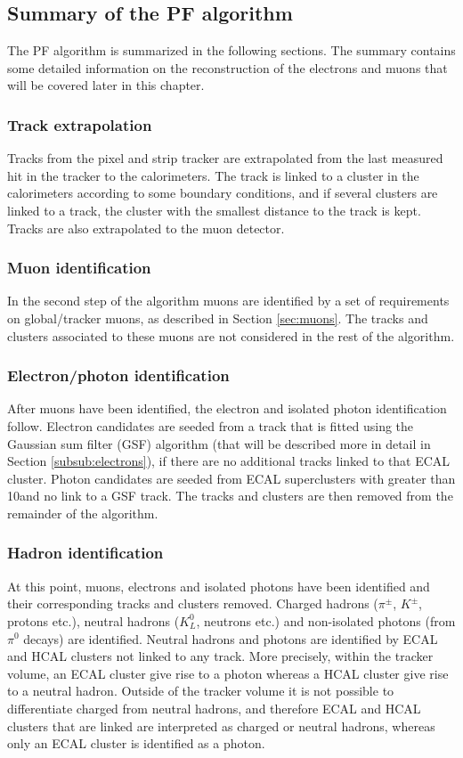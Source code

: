 \subsection*{Summary of the PF algorithm}
\noindent\justify
The PF algorithm is summarized in the following sections. 
The summary contains some detailed information on the reconstruction of the electrons and muons that will be covered later in this chapter.  
\subsubsection*{Track extrapolation}
\noindent\justify
Tracks from the pixel and strip tracker are extrapolated from the last measured hit in the tracker to the calorimeters. 
The track is linked to a cluster in the calorimeters according to some boundary conditions, and if several clusters are linked to a track, the cluster with the smallest distance to the track is kept. 
Tracks are also extrapolated to the muon detector. 
\subsubsection*{Muon identification} 
\noindent\justify
In the second step of the algorithm muons are identified by a set of requirements on global/tracker muons, as described in Section \ref{sec:muons}.
The tracks and clusters associated to these muons are not considered in the rest of the algorithm. 
\subsubsection*{Electron/photon identification} 
\noindent\justify
After muons have been identified, the electron and isolated photon identification follow.
Electron candidates are seeded from a track that is fitted using the Gaussian sum filter (GSF) algorithm (that will be described more in detail in Section \ref{subsub:electrons}), if there are no additional tracks linked to that ECAL cluster. 
Photon candidates are seeded from ECAL superclusters with \ET greater than 10\GeV and no link to a GSF track.
The tracks and clusters are then removed from the remainder of the algorithm. 
\subsubsection*{Hadron identification}  
\noindent\justify
At this point, muons, electrons and isolated photons have been identified and their corresponding tracks and clusters removed.
Charged hadrons ($\pi^{\pm}$, $K^{\pm}$, protons etc.), neutral hadrons ($K_{L}^{0}$, neutrons etc.) and non-isolated photons (from $\pi^{0}$ decays) are identified. 
Neutral hadrons and photons are identified by ECAL and HCAL clusters not linked to any track. 
More precisely, within the tracker volume, an ECAL cluster give rise to a photon whereas a HCAL cluster give rise to a neutral hadron. 
Outside of the tracker volume it is not possible to differentiate charged from neutral hadrons, and therefore ECAL and HCAL clusters that are linked are interpreted as charged or neutral hadrons, whereas only an ECAL cluster is identified as a photon. 
